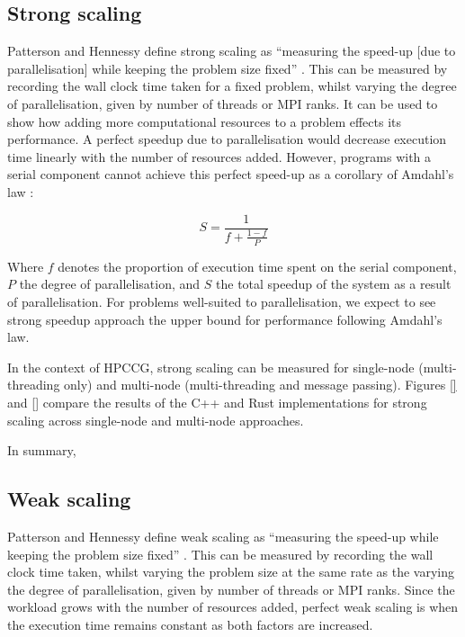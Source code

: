 \subsection{Strong scaling}
\label{ssec:strong-scaling}

Patterson and Hennessy define strong scaling as ``measuring the speed-up [due to parallelisation] while keeping the problem size fixed'' \cite{pattersonHennessyComputerOrganisationArchitecture}. This can be measured by recording the wall clock time taken for a fixed problem, whilst varying the degree of parallelisation, given by number of threads or MPI ranks. It can be used to show how adding more computational resources to a problem effects its performance. A perfect speedup due to parallelisation would decrease execution time linearly with the number of resources added. However, programs with a serial component cannot achieve this perfect speed-up as a corollary of Amdahl's law \cite{amdahlsLaw}:

\begin{equation}
    S = \frac{1}{f + \frac{1-f}{P}}
\end{equation}

Where $f$ denotes the proportion of execution time spent on the serial component, $P$ the degree of parallelisation, and $S$ the total speedup of the system as a result of parallelisation. For problems well-suited to parallelisation, we expect to see strong speedup approach the upper bound for performance following Amdahl's law.

In the context of HPCCG, strong scaling can be measured for single-node (multi-threading only) and multi-node (multi-threading and message passing). Figures \ref{} and \ref{} compare the results of the C++ and Rust implementations for strong scaling across single-node and multi-node approaches.


In summary,

\subsection{Weak scaling}
\label{ssec:weak-scaling}

Patterson and Hennessy define weak scaling as ``measuring the speed-up while keeping the problem size fixed'' \cite{pattersonHennessyComputerOrganisationArchitecture}. This can be measured by recording the wall clock time taken, whilst varying the problem size at the same rate as the varying the degree of parallelisation, given by number of threads or MPI ranks. Since the workload grows with the number of resources added, perfect weak scaling is when the execution time remains constant as both factors are increased.


